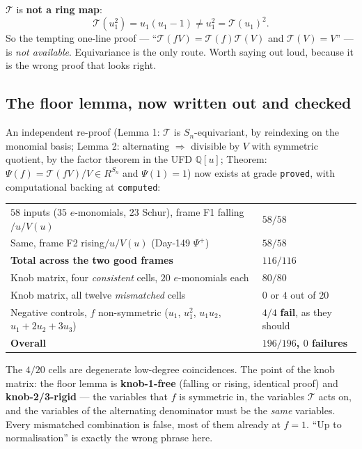\documentclass[11pt,a4paper]{article}
\newcommand{\Q}{\mathbb{Q}}
\theoremstyle{plain}
\theoremstyle{definition}
\begin{document}
$\mathcal T$ is \textbf{not a ring map}:
\[
\mathcal T(u_1^2)=u_1(u_1-1)\neq u_1^2=\mathcal T(u_1)^2 .
\]
So the tempting one-line proof --- ``$\mathcal T(fV)=\mathcal T(f)\mathcal T(V)$ and
$\mathcal T(V)=V$'' --- is \emph{not available}. Equivariance is the only route. Worth
saying out loud, because it is the wrong proof that looks right.

\subsection*{The floor lemma, now written out and checked}

An independent re-proof (Lemma 1: $\mathcal T$ is $S_n$-equivariant, by reindexing on the
monomial basis; Lemma 2: alternating $\Rightarrow$ divisible by $V$ with symmetric quotient,
by the factor theorem in the UFD $\Q[u]$; Theorem: $\Psi(f)=\mathcal T(fV)/V\in R^{S_n}$ and
$\Psi(1)=1$) now exists at grade \texttt{proved}, with computational backing at
\texttt{computed}:

\begin{center}
\begin{tabular}{@{}l|l@{}}
\toprule
$58$ inputs ($35$ $e$-monomials, $23$ Schur), frame F1 falling$/u/V(u)$ & $58/58$ \\
Same, frame F2 rising$/u/V(u)$ (Day-149 $\Psi^+$) & $58/58$ \\
\textbf{Total across the two good frames} & \textbf{$116/116$} \\
Knob matrix, four \emph{consistent} cells, $20$ $e$-monomials each & \textbf{$80/80$} \\
Knob matrix, all twelve \emph{mismatched} cells & $0$ or $4$ out of $20$ \\
Negative controls, $f$ non-symmetric ($u_1$, $u_1^2$, $u_1u_2$, $u_1{+}2u_2{+}3u_3$) &
$4/4$ \textbf{fail}, as they should \\
\midrule
\textbf{Overall} & \textbf{$196/196$, $0$ failures} \\
\bottomrule
\end{tabular}
\end{center}

\noindent The $4/20$ cells are degenerate low-degree coincidences. The point of the knob
matrix: the floor lemma is \textbf{knob-1-free} (falling or rising, identical proof) and
\textbf{knob-2/3-rigid} --- the variables that $f$ is symmetric in, the variables
$\mathcal T$ acts on, and the variables of the alternating denominator must be the
\emph{same} variables. Every mismatched combination is false, most of them already at $f=1$.
``Up to normalisation'' is exactly the wrong phrase here.
\end{document}
